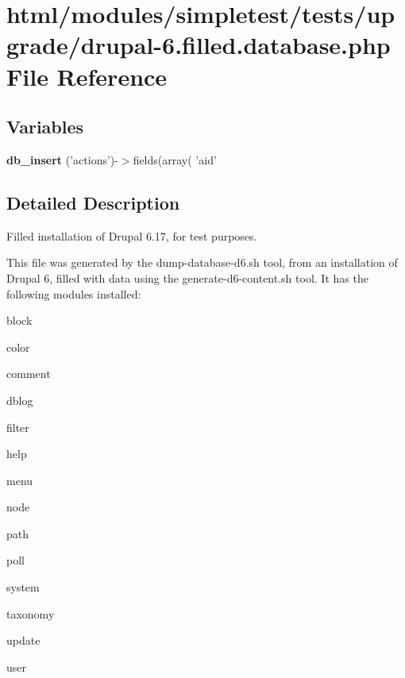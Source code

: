 \hypertarget{drupal-6_8filled_8database_8php}{
\section{html/modules/simpletest/tests/upgrade/drupal-\/6.filled.database.php File Reference}
\label{drupal-6_8filled_8database_8php}
}
\subsection*{Variables}
\begin{DoxyCompactItemize}
\item 
\hypertarget{drupal-6_8filled_8database_8php_a09a3bd9bce913e38b357f83258dc5bc2}{
{\bfseries db\_\-insert} ('actions')-\/$>$fields(array( 'aid'}
\label{drupal-6_8filled_8database_8php_a09a3bd9bce913e38b357f83258dc5bc2}

\end{DoxyCompactItemize}


\subsection{Detailed Description}
Filled installation of Drupal 6.17, for test purposes.

This file was generated by the dump-\/database-\/d6.sh tool, from an installation of Drupal 6, filled with data using the generate-\/d6-\/content.sh tool. It has the following modules installed:
\begin{DoxyItemize}
\item block
\item color
\item comment
\item dblog
\item filter
\item help
\item menu
\item node
\item path
\item poll
\item system
\item taxonomy
\item update
\item user 
\end{DoxyItemize}